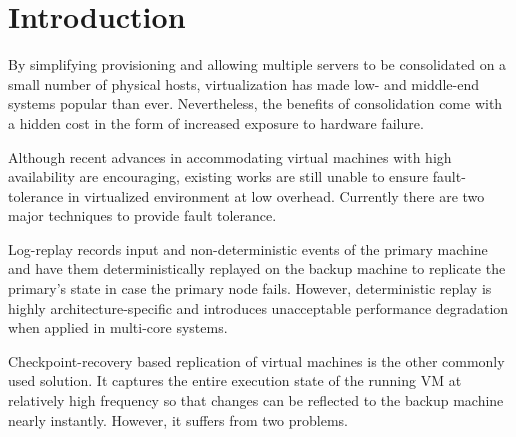 \section{Introduction} \label{sec:intro}

By simplifying provisioning and allowing multiple servers to be consolidated on a 
small number of physical hosts, virtualization has made low- and middle-end systems 
popular than ever. Nevertheless, the benefits of consolidation come with a hidden cost 
in the form of increased exposure to hardware failure. 

Although recent advances in accommodating virtual machines with high availability are encouraging, 
existing works are still unable to ensure fault-tolerance in virtualized environment at low overhead. 
Currently there are two major techniques to provide fault tolerance.

Log-replay records input and non-deterministic events of the primary machine 
and have them deterministically replayed on the backup machine to replicate the primary's state 
in case the primary node fails. However, deterministic replay is highly architecture-specific and 
introduces unacceptable performance degradation when applied in multi-core systems.


Checkpoint-recovery based replication of virtual machines is the other commonly used solution. 
It captures the entire execution state of the running VM at relatively high frequency so that changes 
can be reflected to the backup machine nearly instantly. However, it suffers from two problems.


